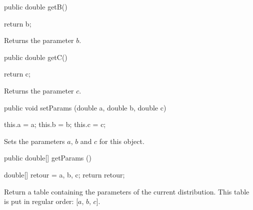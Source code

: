 \begin{code}

   public double getB()\begin{hide} {
      return b;
   }\end{hide}
\end{code} 
  \begin{tabb} Returns the parameter $b$.
  \end{tabb}
\begin{htmlonly}
\end{htmlonly}
\begin{code}

   public double getC()\begin{hide} {
      return c;
   }\end{hide}
\end{code} 
  \begin{tabb} Returns the parameter $c$.
  \end{tabb}
\begin{htmlonly}
\end{htmlonly}
\begin{code}

   public void setParams (double a, double b, double c)\begin{hide} {
      this.a  = a;
      this.b  = b;
      this.c  = c;
   }\end{hide}
\end{code} 
  \begin{tabb} Sets the parameters $a$, $b$ and $c$ for this object.
  \end{tabb}
\begin{htmlonly}
\end{htmlonly}
\begin{code}

   public double[] getParams ()\begin{hide} {
      double[] retour = {a, b, c};
      return retour;
   }\end{hide}
\end{code}
\begin{tabb}
   Return a table containing the parameters of the current distribution.
   This table is put in regular order: [$a$, $b$, $c$].
\end{tabb}
\begin{htmlonly}
   \return{[$a$, $b, $c]}
\end{htmlonly}
